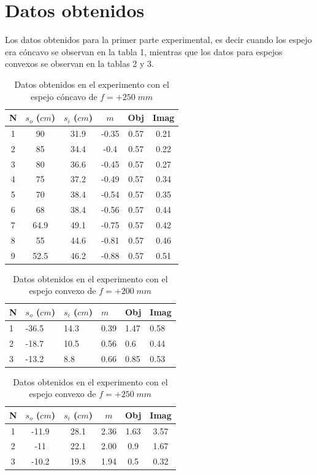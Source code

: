 \documentclass[13,twocolumn,letterpaper]{article}
\begin{document}
\section*{Datos obtenidos}
{
 	Los datos obtenidos para la primer parte experimental, es decir cuando los espejo era cóncavo se observan en la tabla 1, mientras que los  datos para espejos convexos se observan en la tablas 2 y 3.
 	
 	\begin{table}[htb]
 		\raggedright
 		\begin{tabular}{cccccc}
 			N & $s_{o}$ ($cm$) & $s_{i}$ ($cm$)  & $m$ & Obj & Imag  \\ \midrule
			1	&	90	&	31.9	&	-0.35	&	0.57	&	0.21	 \\
			2	&	85	&	34.4	&	-0.4	&	0.57	&	0.22	 \\
			3	&	80	&	36.6	&	-0.45	&	0.57	&	0.27	 \\
			4	&	75	&	37.2	&	-0.49	&	0.57	&	0.34	 \\
			5	&	70	&	38.4	&	-0.54	&	0.57	&	0.35	 \\
			6	&	68	&	38.4	&	-0.56	&	0.57	&	0.44	 \\
			7	&	64.9	&	49.1	&	-0.75	&	0.57	&	0.42	 \\
			8	&	55	&	44.6	&	-0.81	&	0.57	&	0.46	 \\
			9	&	52.5	&	46.2	&	-0.88	&	0.57	&	0.51	 \\\hline
 		\end{tabular}
 		\caption{Datos obtenidos en el experimento con el espejo cóncavo de $f=+250\;mm$} \label{tabla1}
 	\end{table}
 	
 	
 	\begin{table}[htb]
 			\raggedright
 		\begin{tabular}{llllll}
 			N & $s_{o}$ ($cm$) & $s_{i}$ ($cm$)  & $m$ & Obj & Imag  \\ \midrule
			1	&	-36.5	&	14.3	&	0.39	&	1.47	&	0.58  \\
			2	&	-18.7	&	10.5	&	0.56	&	0.6		&	0.44  \\
			3	&	-13.2	&	8.8		&	0.66	&	0.85	&	0.53  \\ \hline 
 		\end{tabular}
 		\caption{Datos obtenidos en el experimento con el espejo convexo de $f=+200\;mm$ } \label{tabla2}
 	\end{table}
 	\begin{table}[htb]
 		\raggedright
 	\begin{tabular}{cccccc}
 		N & $s_{o}$ ($cm$) & $s_{i}$ ($cm$)  & $m$ & Obj & Imag  \\ \midrule
 		1	&	-11.9	&	28.1	&	2.36	&	1.63	&	3.57	 \\
 		2	&	-11		&	22.1	&	2.00	&	0.9		&	1.67	 \\
 		3	&	-10.2	&	19.8	&	1.94	&	0.5		&	0.32	 \\ \hline 
 	\end{tabular}
 	\caption{Datos obtenidos en el experimento con el espejo convexo de $f=+250\;mm$} \label{tabla3}
 \end{table}
 	
}
\end{document}
